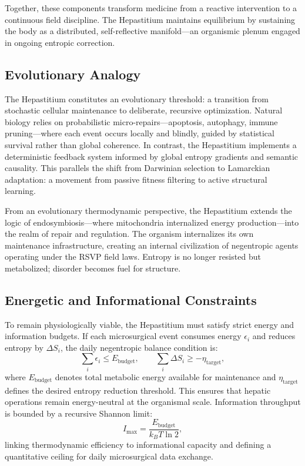 \documentclass[12pt]{article}
\begin{document}
Together, these components transform medicine from a reactive intervention to a continuous field discipline.  
The Hepastitium maintains equilibrium by sustaining the body as a distributed, self-reflective manifold—an organismic plenum engaged in ongoing entropic correction.

\subsection{Evolutionary Analogy}
\label{subsec:evolutionary_analogy}

The Hepastitium constitutes an evolutionary threshold: a transition from stochastic cellular maintenance to deliberate, recursive optimization.  
Natural biology relies on probabilistic micro-repairs—apoptosis, autophagy, immune pruning—where each event occurs locally and blindly, guided by statistical survival rather than global coherence.  
In contrast, the Hepastitium implements a deterministic feedback system informed by global entropy gradients and semantic causality.  
This parallels the shift from Darwinian selection to Lamarckian adaptation: a movement from passive fitness filtering to active structural learning.

From an evolutionary thermodynamic perspective, the Hepastitium extends the logic of endosymbiosis—where mitochondria internalized energy production—into the realm of repair and regulation.  
The organism internalizes its own maintenance infrastructure, creating an internal civilization of negentropic agents operating under the RSVP field laws.  
Entropy is no longer resisted but metabolized; disorder becomes fuel for structure.

\subsection{Energetic and Informational Constraints}
\label{subsec:hepastitium_constraints}

To remain physiologically viable, the Hepastitium must satisfy strict energy and information budgets.  
If each microsurgical event consumes energy \(\epsilon_i\) and reduces entropy by \(\Delta S_i\), the daily negentropic balance condition is:
\begin{equation}
\sum_i \epsilon_i \le E_{\mathrm{budget}}, \qquad 
\sum_i \Delta S_i \ge -\eta_{\mathrm{target}},
\end{equation}
where \(E_{\mathrm{budget}}\) denotes total metabolic energy available for maintenance and \(\eta_{\mathrm{target}}\) defines the desired entropy reduction threshold.  
This ensures that hepatic operations remain energy-neutral at the organismal scale.  
Information throughput is bounded by a recursive Shannon limit:
\begin{equation}
I_{\max} = \frac{E_{\mathrm{budget}}}{k_B T \ln 2},
\end{equation}
linking thermodynamic efficiency to informational capacity and defining a quantitative ceiling for daily microsurgical data exchange.
\end{document}
